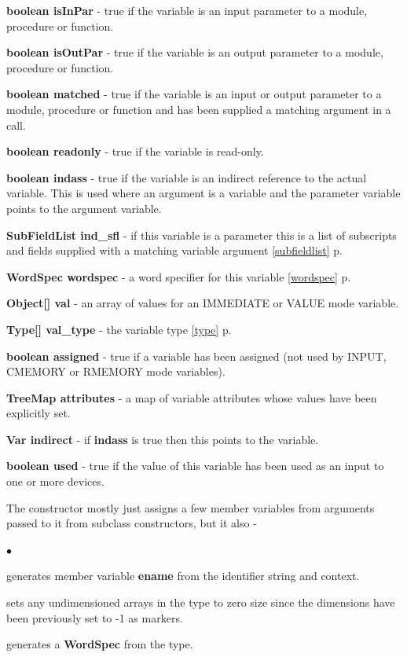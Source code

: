 \documentclass[10pt,a4paper,twoside,fleqn]{book}
\newcommand{\blist}{\begin{list}{$\bullet$}{\setlength{\itemsep}{-5pt}\setlength{\topsep}{-5pt}}}
\newcommand{\blend}{\end{list}}
\newcommand{\autorefph}[1]{\autoref{#1} p\pageref*{#1}}
\begin{document}
            {\bf boolean isInPar} - true if the variable is an input parameter to
            a module, procedure or function.

            {\bf boolean isOutPar} - true if the variable is an output parameter to
            a module, procedure or function.

            {\bf boolean matched} - true if the variable is an input or output
            parameter to a module, procedure or function and has been supplied a
            matching argument in a call.

            {\bf boolean readonly} - true if the variable is read-only.

            {\bf boolean indass} - true if the variable is an indirect reference
            to the actual variable. This is used where an argument is a variable
            and the parameter variable points to the argument variable.

            {\bf SubFieldList ind\_sfl} - if this variable is a parameter this is a
            list of subscripts and fields supplied with a matching variable
            argument \autorefph{subfieldlist}. 

            {\bf WordSpec wordspec} - a word specifier for this variable
            \autorefph{wordspec}.

            {\bf Object[] val} - an array of values for an IMMEDIATE or VALUE
            mode variable.

            {\bf Type[] val\_type} - the variable type \autorefph{type}.

            {\bf boolean assigned} - true if a variable has been assigned (not
            used by INPUT, CMEMORY or RMEMORY mode variables).

            {\bf TreeMap attributes} - a map of variable attributes whose values
            have been explicitly set.

            {\bf Var indirect} - if {\bf indass} is true then this points to the
            variable.

            {\bf boolean used} - true if the value of this variable has been used
            as an input to one or more devices.

            The constructor mostly just assigns a few member variables from
            arguments passed to it from subclass constructors, but it also -
            \blist
            \item   generates member variable {\bf ename} from the identifier
                    string and context.
            \item   sets any undimensioned arrays in the type to zero size since
                    the dimensions have been previously set to -1 as markers.
            \item   generates a {\bf WordSpec} from the type.
            \blend
\end{document}
